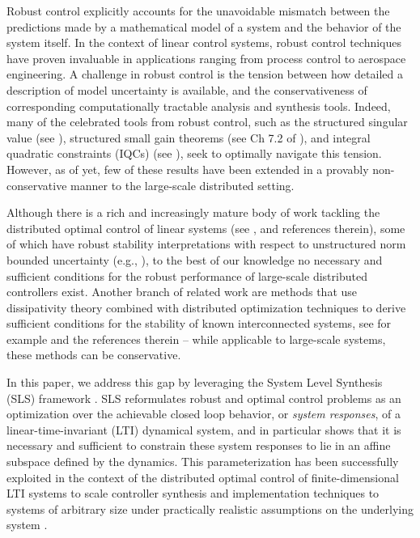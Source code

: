 Robust control explicitly accounts for the unavoidable mismatch between the predictions made by a mathematical model of a system and the behavior of the system itself.  In the context of linear control systems, robust control techniques \cite{khammash1990stability,dahleh1994control,zhou1996robust} have proven invaluable in applications ranging from process control to aerospace engineering.  A challenge in robust control is the tension between how detailed a description of model uncertainty is available, and the conservativeness of corresponding computationally tractable analysis and synthesis tools.  Indeed, many of the celebrated tools from robust control, such as the structured singular value (see \cite{packard1993complex}), structured small gain theorems (see Ch 7.2 of \cite{dahleh1994control}), and integral quadratic constraints (IQCs) (see \cite{megretski1997system}), seek to optimally navigate this tension.  However, as of yet, few of these results have been extended in a provably non-conservative manner to the large-scale distributed setting.

Although there is a rich and increasingly mature body of work tackling the distributed optimal control of linear systems (see \cite{2006_Rotkowitz_QI_TAC, 2012_Mahajan_Info_survey, wang2019system,zheng2019equivalence}, and references therein), some of which have robust stability interpretations with respect to unstructured norm bounded uncertainty (e.g., \cite{langbort2004distributed,matni2014distributed,lessard2014state,rosinger2017structured,ahmadi2018distributed}), to the best of our knowledge no necessary and sufficient conditions for the robust performance of large-scale distributed controllers exist.  Another branch of related work are methods that use dissipativity theory combined with distributed optimization techniques to derive sufficient conditions for the stability of known interconnected systems, see for example \cite{arcak2016networks,meissen2015compositional,anderson2011dynamical} and the references therein -- while applicable to large-scale systems, these methods can be conservative.

In this paper, we address this gap by leveraging the System Level Synthesis (SLS)  framework \cite{anderson2019system,wang2019system}.  SLS reformulates robust and optimal control problems as an optimization over the achievable closed loop behavior, or \emph{system responses}, of a linear-time-invariant (LTI) dynamical system, and in particular shows that it is necessary and sufficient to constrain these system responses to lie in an affine subspace defined by the dynamics.  This parameterization has been successfully exploited in the context of the distributed optimal control of finite-dimensional LTI systems to scale controller synthesis and implementation techniques to systems of arbitrary size under practically realistic assumptions on the underlying system \cite{wang2014localized, wang2016localized,wang2018separable}.  

